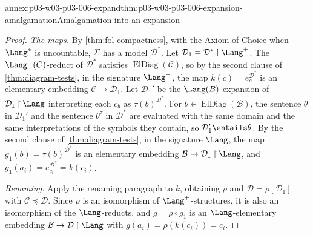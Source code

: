 \begin{annexitem}{annex:p03-w03-p03-006-expand}{thm:p03-w03-p03-006-expansion-amalgamation}{Amalgamation into an expansion}
\begin{proof}
\emph{The maps.}  By \cref{thm:fol-compactness}, with the Axiom of Choice
when \(\Lang^*\) is uncountable, \(\Sigma\) has a model \(\mathcal D^*\).
Let \(\mathcal D_1=\mathcal D^*\mathbin{\upharpoonright}\Lang^+\).  The
\(\Lang^+(C)\)-reduct of \(\mathcal D^*\) satisfies
\(\operatorname{ElDiag}(\mathcal C)\), so by the second clause of
\cref{thm:diagram-tests}, in the signature \(\Lang^+\), the map
\(k(c)=e_c^{\mathcal D^*}\) is an elementary embedding
\(\mathcal C\to\mathcal D_1\).  Let \(\mathcal D_1'\) be the
\(\Lang(B)\)-expansion of \(\mathcal D_1\mathbin{\upharpoonright}\Lang\)
interpreting each \(c_b\) as \(\tau(b)^{\mathcal D^*}\).  For
\(\theta\in\operatorname{ElDiag}(\mathcal B)\), the sentence \(\theta\) in
\(\mathcal D_1'\) and the sentence \(\theta^\tau\) in \(\mathcal D^*\) are
evaluated with the same domain and the same interpretations of the symbols
they contain, so \(\mathcal D_1'\entails\theta\).  By the second clause of
\cref{thm:diagram-tests}, in the signature \(\Lang\), the map
\(g_1(b)=\tau(b)^{\mathcal D^*}\) is an elementary embedding
\(\mathcal B\to\mathcal D_1\mathbin{\upharpoonright}\Lang\), and
\(g_1(a_i)=e_{c_i}^{\mathcal D^*}=k(c_i)\).

\emph{Renaming.}  Apply the renaming paragraph to \(k\), obtaining
\(\rho\) and \(\mathcal D=\rho[\mathcal D_1]\) with
\(\mathcal C\preccurlyeq\mathcal D\).  Since \(\rho\) is an isomorphism of
\(\Lang^+\)-structures, it is also an isomorphism of the
\(\Lang\)-reducts, and \(g=\rho\circ g_1\) is an \(\Lang\)-elementary
embedding \(\mathcal B\to\mathcal D\mathbin{\upharpoonright}\Lang\) with
\(g(a_i)=\rho(k(c_i))=c_i\).
\end{proof}
\end{annexitem}

